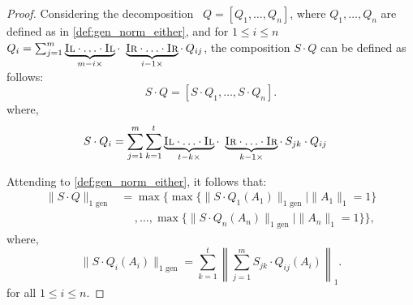 \begin{proof}
Considering the decomposition  $Q=[Q_1, \ldots, Q_n]$, where $Q_1, \ldots, Q_n$ are defined as in \autoref{def:gen_norm_either}, and for $ 1 \leq i \leq n$  $Q_i = \sum_{j=1}^{m} \underbrace{\textsc{Il} \cdot \ldots \cdot \textsc{Il}}_{m-i \times} \cdot  \underbrace{\textsc{Ir} \cdot \ldots \cdot \textsc{Ir}}_{i-1 \times} \cdot \hspace{2pt} Q_{ij}$, the composition $S \cdot Q$ can be defined as follows:
\begin{equation}
  S \cdot Q = [S \cdot Q_1, \ldots, S \cdot Q_n].
\end {equation}
where, 
\begin{equation}
  \begin{split}
  S \cdot Q_i & =  \sum_{j=1}^{m} \sum_{k=1}^{t} \underbrace{\textsc{Il} \cdot \ldots \cdot \textsc{Il}}_{t-k \times} \cdot  \underbrace{\textsc{Ir} \cdot \ldots \cdot \textsc{Ir}}_{k-1 \times} \cdot \hspace{2pt} S_{jk} \cdot Q_{ij}
  \end{split}
\end{equation}


Attending to \autoref{def:gen_norm_either}, it follows that:
\begin{equation} \label{eq:sq_decomposed_norm}
  \begin{split}
 \lVert S \cdot  Q \rVert_{1 \text{ gen}} & = \max \{ \max \{\lVert S \cdot Q_1 (A_1) \rVert_{1 \text{ gen}} \mid \|A_1\|_{1} = 1\} \\
& \hspace{15pt} , \ldots, \max \{\lVert S \cdot Q_n (A_n) \rVert_{1 \text{ gen}} \mid \|A_n\|_{1} = 1 \} \},
\end{split}
\end{equation}
where,
\begin{equation} \label{eq:sqi_norm}
\lVert S \cdot Q_i (A_i) \rVert_{1 \text{ gen}} = \sum_{k=1}^{t} \left\| \sum_{j=1}^{m} S_{jk} \cdot Q_{ij} (A_i) \right\|_{1}.
\end{equation} 
for all $1 \leq i \leq n$.


\end{proof}
